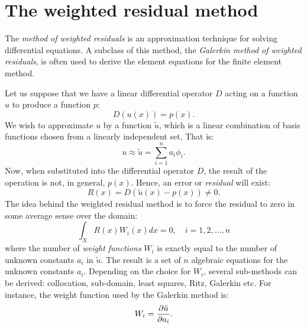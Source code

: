 \chapter{The weighted residual method}
\label{appendix2}

The \emph{method of weighted residuals} is an approximation technique for solving differential equations. A subclass of this method, the \emph{Galerkin method of weighted residuals}, is often used to derive the element equations for the finite element method. 

Let us suppose that we have a linear differential operator $ D $ acting on a function $ u $ to produce a function $ p $:
\begin{equation}
D(u(x)) = p(x).
\end{equation}
We wish to approximate $ u $ by a function $ \tilde{u} $, which is a linear combination of basis functions chosen from a linearly independent set, That is: 
\begin{equation}
u \approx \tilde{u} = \sum_{i=1}^n a_i \phi_i .
\end{equation}
Now, when substituted into the differential operator $ D $, the result of the operation is not, in general, $ p(x) $. Hence, an error or \emph{residual} will exist:
\begin{equation}
R(x) = D(\tilde{u}(x)-p(x)) \neq 0.
\end{equation}
The idea behind the weighted residual method is to force the residual to zero in some average sense over the domain:
\begin{equation}
\int_X R(x) W_i(x) dx = 0, \quad i = 1, 2, \ldots, n
\end{equation}
where the number of \emph{weight functions} $ W_i $ is exactly equal to the number of unknown constants $ a_i $ in $ \tilde{u} $. The result is a set of $ n $ algebraic equations for the unknown constants $ a_i $. Depending on the choice for $ W_i $, several sub-methods can be derived: collocation, sub-domain, least squares, Ritz, Galerkin etc. For instance, the weight function used by the Galerkin method  is:
\begin{equation}
W_i = \dfrac{\partial \tilde{u}}{\partial a_i}.
\end{equation}